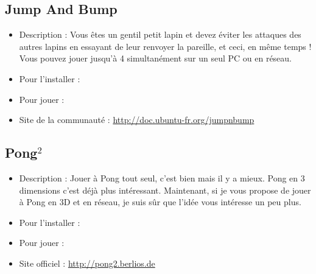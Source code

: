 \subsection{Jump And Bump}
\begin{itemize}
\begingroup
{}
\item Description : Vous êtes un gentil petit lapin et devez éviter les attaques des autres lapins en essayant de leur renvoyer la pareille, et ceci, en même temps ! Vous pouvez jouer jusqu'à 4 simultanément sur un seul PC ou en réseau.{\par}
\endgroup
\item Pour l'installer : 
\item Pour jouer : 
\item Site de la communauté : \url{http://doc.ubuntu-fr.org/jumpnbump}{\par}
\end{itemize}
\subsection{Pong$^2$}
\begin{itemize}
\begingroup
{}
\item Description : Jouer à Pong tout seul, c'est bien mais il y a mieux. Pong en 3 dimensions c'est déjà plus intéressant. Maintenant, si je vous propose de jouer à Pong en 3D et en réseau, je suis sûr que l'idée vous intéresse un peu plus.{\par}
\item Pour l'installer : 
\item Pour jouer : 
\item Site officiel : \url{http://pong2.berlios.de}{\par}
\endgroup
\end{itemize}
